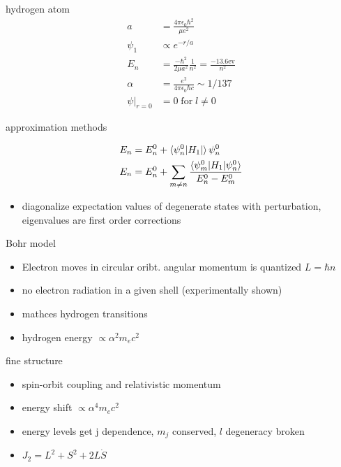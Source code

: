 \documentclass[avery5388, frame, grid]{flashcards}
\begin{document}
\begin{flashcard}{hydrogen atom}
  {
    \begin{align*}
      a &= \frac{4 \pi \epsilon_{0} \hbar^{2}}{\mu e^{2}}\\
      \psi_{1} &\propto e^{-r/a}\\
      E_{n} &= \frac{- \hbar^{2}}{2 \mu a^{2}} \frac{1}{n^{2}} = \frac{-13.6 \textrm{ev}}{n^{2}}\\
      \alpha &= \frac{e^{2}}{4 \pi \epsilon_{0} \hbar c} \sim 1 / 137\\
      \psi \lvert_{r = 0} &= 0 \; \textrm{for} \; l \neq 0
    \end{align*}
  }
\end{flashcard}

\begin{flashcard}{approximation methods}
  {
    \begin{align*}
      E_{n} &= E_{n}^{0} + \braket{\psi_{n}^{0} \lvert H_{1} \rvert}{\psi_{n}^{0}}\\
      E_{n} &= E_{n}^{0} + \sum_{m \neq n} \frac{\braket{\psi_{m}^{0} \lvert H_{1} \rvert \psi_{n}^{0}}}{E_{n}^{0} - E_{m}^{0}}
    \end{align*}

    \begin{itemize}
    \item diagonalize expectation values of degenerate states with perturbation,
      eigenvalues are first order corrections
    \end{itemize}
  }
\end{flashcard}

\begin{flashcard}{Bohr model}
  {
    \begin{itemize}
    \item Electron moves in circular oribt. angular momentum is quantized $L = \hbar n$
    \item no electron radiation in a given shell (experimentally shown)
    \item mathces hydrogen transitions
    \item hydrogen energy $\propto \alpha^{2} m_{e} c^{2}$
    \end{itemize}
  }
\end{flashcard}

\begin{flashcard}{fine structure}
  {
    \begin{itemize}
    \item spin-orbit coupling and relativistic momentum
    \item energy shift $\propto \alpha^{4} m_{e} c^{2}$
    \item energy levels get j dependence, $m_{j}$ conserved, $l$ degeneracy broken
    \item $J_{2} = L^{2} + S^{2} + 2 L \dot S$
    \end{itemize}
  }
\end{flashcard}
\end{document}
